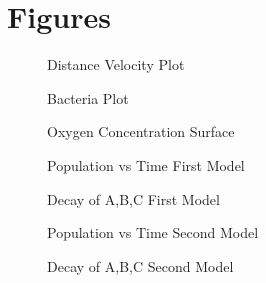 \documentclass{article}
\begin{document}
\section{Figures}
\begin{figure}[h!]
\begin{center}
\caption{Distance Velocity Plot}
\end{center}
\end{figure}



\begin{figure}[h!]
\begin{center}
\caption{Bacteria Plot}
\end{center}
\end{figure}

\begin{figure}[h!]
\begin{center}
\caption{Oxygen Concentration Surface}
\end{center}
\end{figure}

\begin{figure}[h!]
\begin{center}
\caption{Population vs Time First Model}
\end{center}
\end{figure}


\begin{figure}[h!]
\begin{center}
\caption{Decay of A,B,C First Model}
\end{center}
\end{figure}


\begin{figure}[h!]
\begin{center}
\caption{Population vs Time Second Model}
\end{center}
\end{figure}



\begin{figure}[h!]
\begin{center}
\caption{Decay of A,B,C Second Model}
\end{center}
\end{figure}
\end{document}
